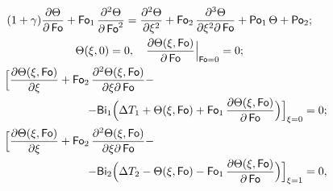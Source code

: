 \begin{gather}

\label{kud:eq46}

(1+\gamma )\frac{\partial \Theta }{\partial \operatorname{\sf Fo}}+\operatorname{\sf Fo}_1 \frac{\partial ^2\Theta }{\partial \operatorname{\sf Fo}^2}=\frac{\partial ^2\Theta }{\partial \xi ^2}+\operatorname{\sf Fo}_2 \frac{\partial ^3\Theta }{\partial \xi^2\partial \operatorname{\sf Fo}}+ \operatorname{\sf Po}_1 \Theta + \operatorname{\sf Po}_2;\\

\label{kud:eq49}

\Theta (\xi, 0)  =0,

\quad

\frac{\partial \Theta (\xi, {\sf Fo}) }{\partial \operatorname{\sf Fo}} \Big|_{\operatorname{\sf Fo}=0} =0;\\

\Bigl[

\frac{\partial \Theta (\xi, {\sf Fo}) }{\partial \xi} +\operatorname{\sf Fo}_2 

\frac{ \partial^2\Theta (\xi, {\sf Fo})}{\partial \xi \partial \operatorname{\sf Fo}}- \hspace{5cm}

\\ \hspace{3cm} -

{\sf Bi}_ 1 \Bigl( \Delta T_1 +

\Theta (\xi, {\sf Fo}) +\operatorname{\sf Fo}_1 \frac{\partial \Theta (\xi, {\sf Fo})} {\partial \operatorname{\sf Fo} } \Bigl)

\Bigr]_{\xi =0} =0;

\label{kud:eq49}

\\

\Bigl[

\frac{\partial \Theta (\xi, {\sf Fo}) }{\partial \xi} +

\operatorname{\sf Fo}_2 \frac{ \partial^2\Theta (\xi, {\sf Fo})} {\partial \xi \partial \operatorname{\sf Fo}}- 

\hspace{5cm}

\\ \hspace{3cm} -

{\sf Bi}_2 \Bigl(

\Delta T_2 -\Theta (\xi, {\sf Fo}) -

\operatorname{\sf Fo}_1 \frac{ \partial \Theta (\xi, {\sf Fo})} {\partial \operatorname{\sf Fo}} \Bigr)\Bigr]_{\xi =1} =0,

\label{kud:eq49}

\end{gather}

